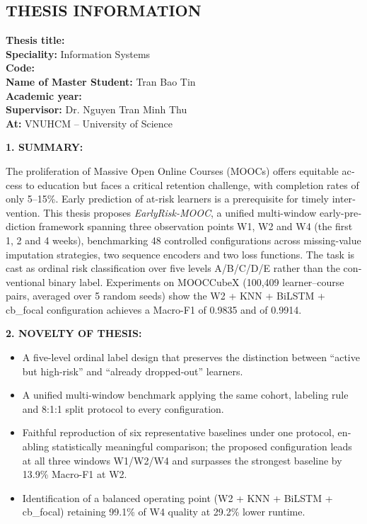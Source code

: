 \begin{english}
\chapter*{THESIS INFORMATION}

\begin{flushleft}
\textbf{Thesis title:} \thesistitleen\\[3pt]
\textbf{Speciality:} Information Systems\\[3pt]
\textbf{Code:} \masonganh\\[3pt]
\textbf{Name of Master Student:} Tran Bao Tin\\[3pt]
\textbf{Academic year:} \khoadaotao\\[3pt]
\textbf{Supervisor:} Dr. Nguyen Tran Minh Thu\\[3pt]
\textbf{At:} VNUHCM -- University of Science
\end{flushleft}

\vspace{0.3cm}
\noindent\textbf{1. SUMMARY:}

\noindent The proliferation of Massive Open Online Courses (MOOCs) offers equitable access to education but faces a critical retention challenge, with completion rates of only 5--15\%. Early prediction of at-risk learners is a prerequisite for timely intervention. This thesis proposes \textit{EarlyRisk-MOOC}, a unified multi-window early-prediction framework spanning three observation points W1, W2 and W4 (the first 1, 2 and 4 weeks), benchmarking 48 controlled configurations across missing-value imputation strategies, two sequence encoders and two loss functions. The task is cast as ordinal risk classification over five levels A/B/C/D/E rather than the conventional binary label. Experiments on MOOCCubeX (100{,}409 learner--course pairs, averaged over 5 random seeds) show the W2 + KNN + BiLSTM + cb\_focal configuration achieves a Macro-F1 of 0.9835 and \FoneD{} of 0.9914.

\vspace{0.2cm}
\noindent\textbf{2. NOVELTY OF THESIS:}
\begin{itemize}[leftmargin=1.2cm,topsep=2pt,itemsep=1pt]
  \item A five-level ordinal label design that preserves the distinction between ``active but high-risk'' and ``already dropped-out'' learners.
  \item A unified multi-window benchmark applying the same cohort, labeling rule and 8:1:1 split protocol to every configuration.
  \item Faithful reproduction of six representative baselines under one protocol, enabling statistically meaningful comparison; the proposed configuration leads at all three windows W1/W2/W4 and surpasses the strongest baseline by 13.9\% Macro-F1 at W2.
  \item Identification of a balanced operating point (W2 + KNN + BiLSTM + cb\_focal) retaining 99.1\% of W4 quality at 29.2\% lower runtime.
\end{itemize}


\end{english}
